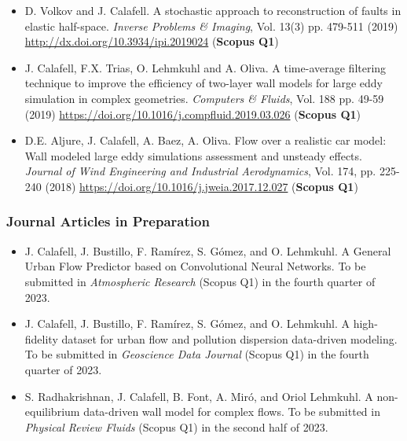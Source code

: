 \documentclass{article}
\begin{document}
\begin{itemize}

\item D. Volkov and J. Calafell. A stochastic approach to reconstruction of faults in elastic half-space. {\it Inverse Problems \& Imaging}, Vol. 13(3) pp. 479-511 (2019) \href{http://dx.doi.org/10.3934/ipi.2019024}{http://dx.doi.org/10.3934/ipi.2019024} ({\bf Scopus Q1})

\item J. Calafell, F.X. Trias, O. Lehmkuhl and A. Oliva. A time-average filtering technique to improve the efficiency of two-layer wall models for large eddy simulation in complex geometries. {\it Computers \& Fluids}, Vol. 188 pp. 49-59 (2019) \href{https://doi.org/10.1016/j.compfluid.2019.03.026}{https://doi.org/10.1016/j.compfluid.2019.03.026} ({\bf Scopus Q1})

\item D.E. Aljure, J. Calafell, A. Baez, A. Oliva. Flow over a realistic car model: Wall modeled large eddy simulations assessment and unsteady effects. {\it Journal of Wind Engineering and Industrial Aerodynamics}, Vol. 174, pp. 225-240 (2018) \href{https://doi.org/10.1016/j.jweia.2017.12.027}{https://doi.org/10.1016/j.jweia.2017.12.027} ({\bf Scopus Q1})

\end{itemize}

\subsubsection{Journal Articles in Preparation}

\begin{itemize}

\item J. Calafell, J. Bustillo, F. Ramírez, S. Gómez, and O. Lehmkuhl. A General Urban Flow Predictor based on Convolutional Neural Networks. To be submitted in {\it Atmospheric Research} (Scopus Q1) in the fourth quarter of 2023. 

\item J. Calafell, J. Bustillo, F. Ramírez, S. Gómez, and O. Lehmkuhl. A high-fidelity dataset for urban flow and pollution dispersion data-driven modeling. To be submitted in {\it Geoscience Data Journal} (Scopus Q1) in the fourth quarter of 2023. 

\item S. Radhakrishnan, J. Calafell, B. Font, A. Miró, and Oriol Lehmkuhl. A non-equilibrium data-driven wall model for complex flows. To be submitted in {\it Physical Review Fluids} (Scopus Q1) in the second half of 2023. 

\end{itemize}
\end{document}
